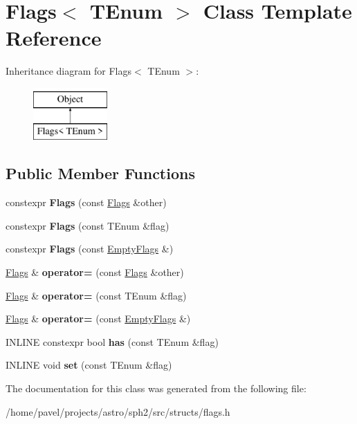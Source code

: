 \hypertarget{classFlags}{}\section{Flags$<$ T\+Enum $>$ Class Template Reference}
\label{classFlags}
Inheritance diagram for Flags$<$ T\+Enum $>$\+:\begin{figure}[H]
\begin{center}
\leavevmode
\includegraphics[height=2.000000cm]{classFlags}
\end{center}
\end{figure}
\subsection*{Public Member Functions}
\begin{DoxyCompactItemize}
\item 
\hypertarget{classFlags_aaaea7c330f4ffaa266da7424fe137bf3}{}\label{classFlags_aaaea7c330f4ffaa266da7424fe137bf3} 
constexpr {\bfseries Flags} (const \hyperlink{classFlags}{Flags} \&other)
\item 
\hypertarget{classFlags_a67682a31b1a6dd3b48380f66018f1967}{}\label{classFlags_a67682a31b1a6dd3b48380f66018f1967} 
constexpr {\bfseries Flags} (const T\+Enum \&flag)
\item 
\hypertarget{classFlags_a02d1646c04516dcbd5143fb227f8cc6f}{}\label{classFlags_a02d1646c04516dcbd5143fb227f8cc6f} 
constexpr {\bfseries Flags} (const \hyperlink{structEmptyFlags}{Empty\+Flags} \&)
\item 
\hypertarget{classFlags_a31303f5a1720ea7f5e8f0596153043f6}{}\label{classFlags_a31303f5a1720ea7f5e8f0596153043f6} 
\hyperlink{classFlags}{Flags} \& {\bfseries operator=} (const \hyperlink{classFlags}{Flags} \&other)
\item 
\hypertarget{classFlags_a3a8dea91e73fcbe35ec69b25f188cba4}{}\label{classFlags_a3a8dea91e73fcbe35ec69b25f188cba4} 
\hyperlink{classFlags}{Flags} \& {\bfseries operator=} (const T\+Enum \&flag)
\item 
\hypertarget{classFlags_a92eee8c71a46d2898b4d23543bfa5c69}{}\label{classFlags_a92eee8c71a46d2898b4d23543bfa5c69} 
\hyperlink{classFlags}{Flags} \& {\bfseries operator=} (const \hyperlink{structEmptyFlags}{Empty\+Flags} \&)
\item 
\hypertarget{classFlags_a03310032017d554f592f4652a97880c7}{}\label{classFlags_a03310032017d554f592f4652a97880c7} 
I\+N\+L\+I\+NE constexpr bool {\bfseries has} (const T\+Enum \&flag)
\item 
\hypertarget{classFlags_afa774f872964f72be8c2d847a9bdd659}{}\label{classFlags_afa774f872964f72be8c2d847a9bdd659} 
I\+N\+L\+I\+NE void {\bfseries set} (const T\+Enum \&flag)
\end{DoxyCompactItemize}


The documentation for this class was generated from the following file\+:\begin{DoxyCompactItemize}
\item 
/home/pavel/projects/astro/sph2/src/structs/flags.\+h\end{DoxyCompactItemize}
